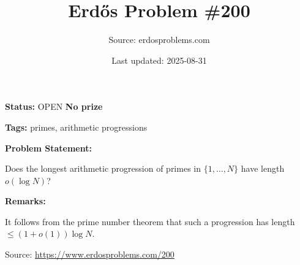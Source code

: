 \documentclass{article}
\title{Erd\H{o}s Problem \#200}
\date{Last updated: 2025-08-31}
\author{Source: erdosproblems.com}
\begin{document}
\maketitle

\noindent\textbf{Status:} OPEN \quad \textbf{No prize}

\noindent\textbf{Tags:} primes, arithmetic progressions

\medskip
\noindent\textbf{Problem Statement:}

Does the longest arithmetic progression of primes in $\{1,\ldots,N\}$ have length $o(\log N)$?

\bigskip
\noindent\textbf{Remarks:}

It follows from the prime number theorem that such a progression has length $\leq(1+o(1))\log N$.

\bigskip
\noindent\small{Source: \url{https://www.erdosproblems.com/200}}
\end{document}
